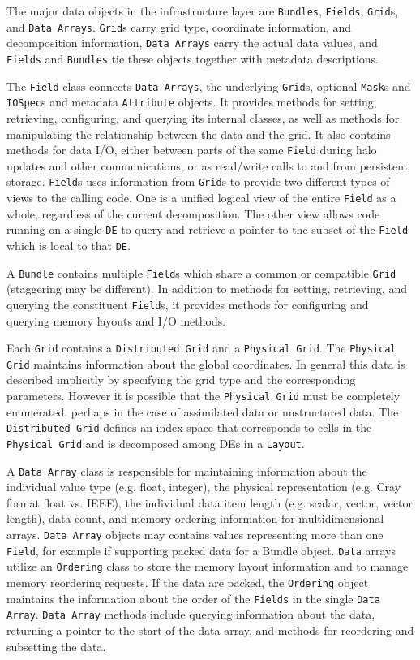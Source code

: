 The major data objects in the infrastructure layer are {\tt Bundles},
{\tt Fields}, {\tt Grid}s, and {\tt Data Arrays}.
{\tt Grid}s carry grid type, coordinate information,
and decomposition information, {\tt Data Arrays} carry the actual
data values, and {\tt Fields} and {\tt Bundles} tie these objects 
together with metadata descriptions.

The {\tt Field} class connects {\tt Data Arrays}, the underlying
{\tt Grid}s, optional {\tt Mask}s and {\tt IOSpec}s and metadata 
{\tt Attribute} objects.  It provides methods
for setting, retrieving, configuring, and querying its internal classes,
as well as methods for manipulating the relationship between the
data and the grid.  It also contains methods for data I/O, either
between parts of the same {\tt Field} during halo updates and other
communications, or as 
read/write calls to and from persistent storage.
{\tt Field}s uses information from {\tt Grid}s to provide
two different types of views to the calling code.
One is a unified logical view of the entire {\tt Field} as a whole,
regardless of the current decomposition.  The other view allows code
running on a single {\tt DE} to query and retrieve a pointer 
to the subset of the {\tt Field} which is local to that {\tt DE}.

A {\tt Bundle} contains multiple {\tt Field}s which share a
common or compatible {\tt Grid} (staggering may be different).  In 
addition to methods for
setting, retrieving, and querying the constituent {\tt Field}s, it provides
methods for configuring and querying memory layouts and I/O methods.

Each {\tt Grid} contains a {\tt Distributed Grid} and a 
{\tt Physical Grid}.  The {\tt Physical Grid} maintains
information about the global coordinates.  In general this data
is described implicitly by specifying the grid type and the
corresponding parameters.  However it is possible that the
{\tt Physical Grid} must be completely enumerated, perhaps in the
case of assimilated data or unstructured data.
The {\tt Distributed Grid} defines an index space that corresponds to
cells in the {\tt Physical Grid} and is decomposed among {DE}s in a 
{\tt Layout}.  

A {\tt Data Array} class is responsible for maintaining
information about the individual value type (e.g. float, integer), 
the physical representation (e.g. Cray format float vs. IEEE), the 
individual data item length (e.g. scalar, vector, vector length), 
data count, and memory ordering information for 
multidimensional arrays.  {\tt Data Array} objects may contains values 
representing more than one {\tt Field}, for example if supporting
packed data for a Bundle object.
{\tt Data} arrays utilize an {\tt Ordering} class to store the
memory layout information and to manage memory reordering requests.
If the data are packed, the {\tt Ordering} object maintains the information
about the order of the {\tt Fields} in the single {\tt Data Array}.
{\tt Data Array} methods include querying information about the
data, returning a pointer to the start of the data
array, and methods for reordering and subsetting the data.


